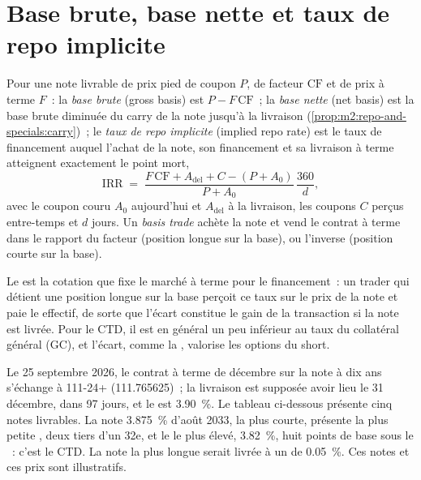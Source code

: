 \section{Base brute, base nette et taux de repo implicite}

\begin{definition}\label{def:m2:bond-futures:irr}
Pour une note livrable de prix pied de coupon $P$, de facteur $\mathrm{CF}$ et de
prix à terme $F$~: la \emph{base brute} (gross basis) est $P - F\,\mathrm{CF}$~;
la \emph{base nette} (net basis) est la base brute diminuée du carry de la note
jusqu'à la livraison (\cref{prop:m2:repo-and-specials:carry})~; le \emph{taux de repo
implicite} (implied repo rate) est le taux de financement auquel l'achat de la note,
son financement et sa livraison à terme atteignent exactement le point mort,
\[
\text{IRR} \;=\; \frac{F\,\mathrm{CF} + A_{\text{del}} + C - (P + A_0)}{P + A_0}\,\frac{360}{d},
\]
avec le coupon couru $A_0$ aujourd'hui et $A_{\text{del}}$ à la livraison, les coupons
$C$ perçus entre-temps et $d$ jours. Un \emph{basis trade}
achète la note et vend le contrat à terme dans le rapport du facteur (position longue sur la
base), ou l'inverse (position courte sur la base).
\end{definition}

Le  est la cotation que fixe le marché à terme pour le financement~: un trader
qui détient une position longue sur la base perçoit ce taux sur le prix de la note et paie le  effectif,
de sorte que l'écart constitue le gain de la transaction si la note est livrée. Pour le
CTD, il est en général un peu inférieur au taux du collatéral général (GC), et l'écart, comme la ,
valorise les options du short.

\begin{example}\label{ex:m2:bond-futures:basket}
Le 25 septembre 2026, le contrat à terme de décembre sur la note à dix ans s'échange à 111-24+
(111.765625)~; la livraison est supposée avoir lieu le 31 décembre, dans 97 jours, et le  est
3.90~\%. Le tableau ci-dessous présente cinq notes livrables. La
note 3.875~\% d'août 2033, la plus courte, présente la plus petite ,
deux tiers d'un 32e, et le  le plus élevé, 3.82~\%, huit points de base
sous le ~: c'est le CTD. La note la plus longue serait livrée à un  de 0.05~\%. Ces notes et ces prix sont illustratifs.
\end{example}

